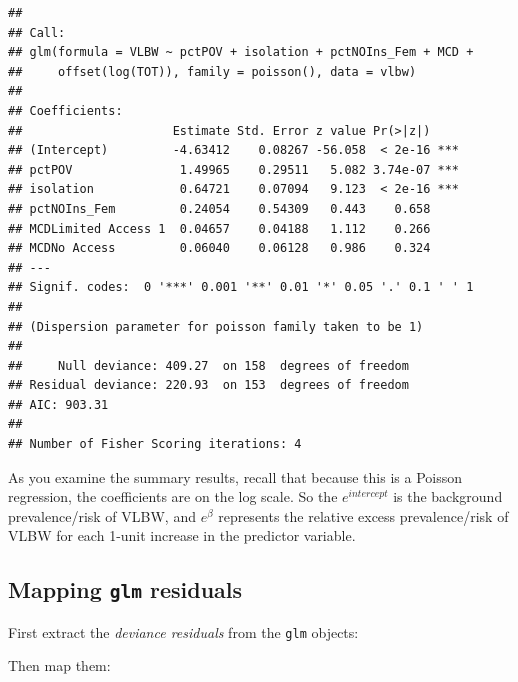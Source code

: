 \documentclass[
]{book}
\newenvironment{Shaded}{\begin{snugshade}}{\end{snugshade}}
\newcommand{\AttributeTok}[1]{\textcolor[rgb]{0.13,0.29,0.53}{#1}}
\newcommand{\FunctionTok}[1]{\textcolor[rgb]{0.13,0.29,0.53}{\textbf{#1}}}
\newcommand{\NormalTok}[1]{#1}
\newcommand{\OtherTok}[1]{\textcolor[rgb]{0.56,0.35,0.01}{#1}}
\newcommand{\SpecialCharTok}[1]{\textcolor[rgb]{0.81,0.36,0.00}{\textbf{#1}}}
\newcommand{\StringTok}[1]{\textcolor[rgb]{0.31,0.60,0.02}{#1}}
\begin{document}
\begin{verbatim}
## 
## Call:
## glm(formula = VLBW ~ pctPOV + isolation + pctNOIns_Fem + MCD + 
##     offset(log(TOT)), family = poisson(), data = vlbw)
## 
## Coefficients:
##                     Estimate Std. Error z value Pr(>|z|)    
## (Intercept)         -4.63412    0.08267 -56.058  < 2e-16 ***
## pctPOV               1.49965    0.29511   5.082 3.74e-07 ***
## isolation            0.64721    0.07094   9.123  < 2e-16 ***
## pctNOIns_Fem         0.24054    0.54309   0.443    0.658    
## MCDLimited Access 1  0.04657    0.04188   1.112    0.266    
## MCDNo Access         0.06040    0.06128   0.986    0.324    
## ---
## Signif. codes:  0 '***' 0.001 '**' 0.01 '*' 0.05 '.' 0.1 ' ' 1
## 
## (Dispersion parameter for poisson family taken to be 1)
## 
##     Null deviance: 409.27  on 158  degrees of freedom
## Residual deviance: 220.93  on 153  degrees of freedom
## AIC: 903.31
## 
## Number of Fisher Scoring iterations: 4
\end{verbatim}

As you examine the summary results, recall that because this is a Poisson regression, the coefficients are on the log scale. So the \(e^{intercept}\) is the background prevalence/risk of VLBW, and \(e^\beta\) represents the relative excess prevalence/risk of VLBW for each 1-unit increase in the predictor variable.

\hypertarget{mapping-glm-residuals}{%
\subsection{\texorpdfstring{Mapping \texttt{glm} residuals}{Mapping glm residuals}}\label{mapping-glm-residuals}}

First extract the \emph{deviance residuals} from the \texttt{glm} objects:

\begin{Shaded}
\end{Shaded}

Then map them:
\end{document}
